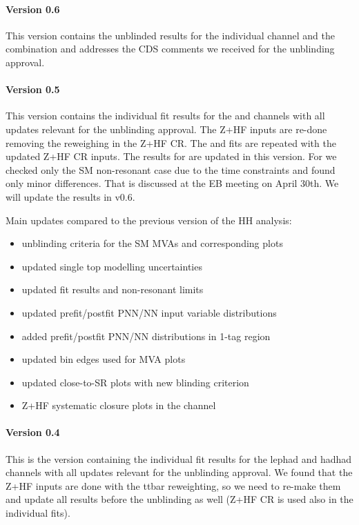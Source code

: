 \paragraph*{Version 0.6}

This version contains the unblinded results for the individual channel and the combination and addresses
the CDS comments we received for the unblinding approval.


\paragraph*{Version 0.5}
This version contains the individual fit results for the \lephad and \hadhad channels with all updates relevant for the 
unblinding approval. The Z+HF inputs are re-done removing the \ttbar reweighing in the Z+HF CR. The \lephad and
\hadhad fits are repeated with the updated Z+HF CR inputs. The results for \lephad are updated in this version.
For \hadhad we checked only the SM non-resonant case due to the time constraints and found only minor differences.
That is discussed at the EB meeting on April 30th. We will update the \hadhad results in v0.6. 

Main updates compared to the previous version of the HH analysis:
\begin{itemize}
\item unblinding criteria for the SM MVAs and corresponding plots
\item updated single top modelling uncertainties
\item updated \lephad fit results and non-resonant limits
\item updated \lephad prefit/postfit PNN/NN input variable distributions
\item added \lephad prefit/postfit PNN/NN distributions in 1-tag region
\item updated bin edges used for \lephad MVA plots
\item updated \hadhad close-to-SR plots with new blinding criterion
\item Z+HF systematic closure plots in the \hadhad channel
\end{itemize}

\paragraph*{Version 0.4}

This is the version containing the individual fit results for the lephad and hadhad channels with all updates relevant for the unblinding approval. We found that the Z+HF inputs
are done with the ttbar reweighting, so we need to re-make them and update all results before the unblinding as well (Z+HF CR is used also in the individual fits). 

